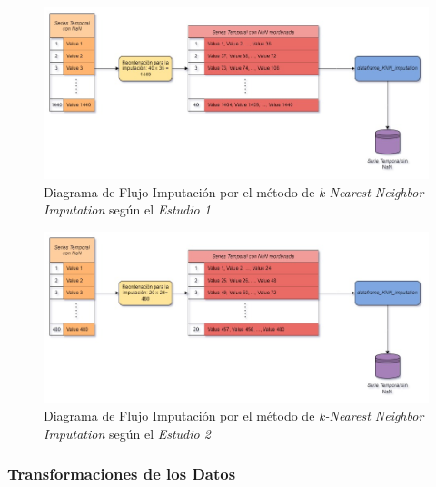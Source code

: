 \newpage
\thispagestyle{empty}
\begin{landscape}
    \begin{figure}[H]
        \centering
        \includegraphics[scale = 0.5]{./img/knn-diagram-e1.jpg}
        \caption{Diagrama de Flujo Imputación por el método de \textit{k-Nearest Neighbor Imputation} según el \textit{Estudio 1}}
        \label{fig:knn-diagram-e1}
    \end{figure}
    \begin{figure}[H]
        \centering
        \includegraphics[scale = 0.5]{./img/knn-diagram-e2.jpg}
        \caption{Diagrama de Flujo Imputación por el método de \textit{k-Nearest Neighbor Imputation} según el \textit{Estudio 2}}
        \label{fig:knn-diagram-e2}
    \end{figure}
\end{landscape}
\restoregeometry 

\newpage
\subsubsection{Transformaciones de los Datos}\label{sec:transformaciones-de-datos}


